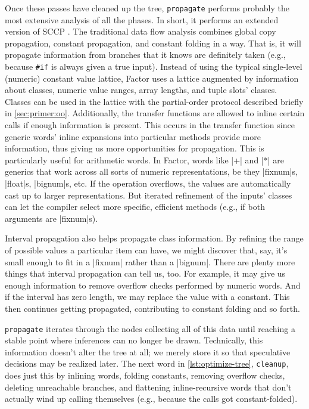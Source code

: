 Once these passes have cleaned up the tree, \Verb|propagate| performs probably
the most extensive analysis of all the phases.  In short, it performs an
extended version of \gls{SCCP} \autocite{SCCP}.  The traditional data flow
analysis combines global copy propagation, constant propagation, and constant
folding in a  way.  That is, it will propagate information
from branches that it knows are definitely taken (e.g., because \Verb|#if| is
always given a true input).  Instead of using the typical single-level
(numeric) constant value lattice, Factor uses a lattice augmented by
information about classes, numeric value ranges, array lengths, and tuple
slots' classes.  Classes can be used in the lattice with the partial-order
protocol described briefly in \cref{sec:primer:oo}.  Additionally, the transfer
functions are allowed to inline certain calls if enough information is present.
This occurs in the transfer function since generic words' inline expansions
into particular methods provide more information, thus giving us more
opportunities for propagation.  This is particularly useful for arithmetic
words.  In Factor, words like \factor|+| and \factor|*| are generics that work
across all sorts of numeric representations, be they \factor|fixnum|s,
\factor|float|s, \factor|bignum|s, etc.  If the operation overflows, the values
are automatically cast up to larger representations.  But iterated refinement
of the inputs' classes can let the compiler select more specific, efficient
methods (e.g., if both arguments are \factor|fixnum|s).

Interval propagation also helps propagate class information.  By refining the
range of possible values a particular item can have, we might discover that,
say, it's small enough to fit in a \factor|fixnum| rather than a
\factor|bignum|.  There are plenty more things that interval propagation can
tell us, too.  For example, it may give us enough information to remove
overflow checks performed by numeric words.  And if the interval has zero
length, we may replace the value with a constant.  This then continues getting
propagated, contributing to constant folding and so forth.

\Verb|propagate| iterates through the nodes collecting all of this data until
reaching a stable point where inferences can no longer be drawn.  Technically,
this information doesn't alter the tree at all; we merely store it so that
speculative decisions may be realized later.  The next word in
\cref{lst:optimize-tree}, \Verb|cleanup|, does just this by inlining words,
folding constants, removing overflow checks, deleting unreachable branches, and
flattening inline-recursive words that don't actually wind up calling
themselves (e.g., because the calls got constant-folded).

